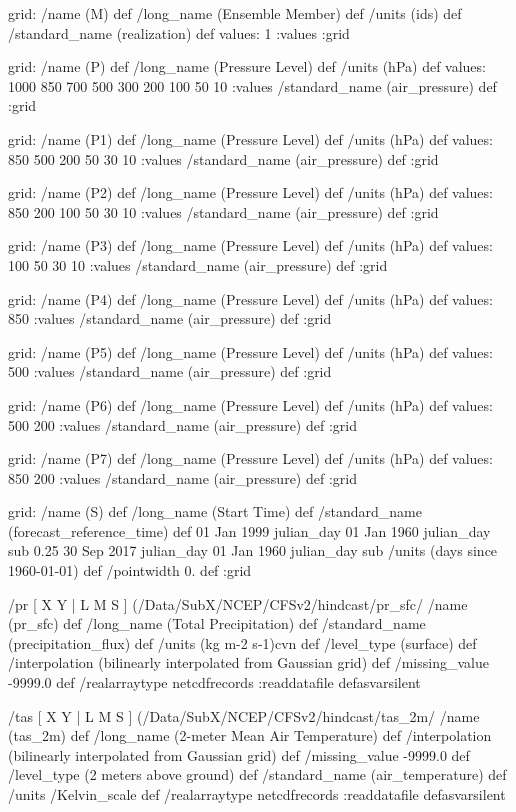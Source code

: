 \begin{ingrid}
grid:
/name (M) def
/long_name (Ensemble Member) def
/units (ids) def
/standard_name (realization) def
values: 1 :values
:grid

grid:
/name (P) def
/long_name (Pressure Level) def
/units (hPa) def
values: 1000 850 700 500 300 200 100 50 10 :values
/standard_name (air_pressure) def
:grid

grid:
/name (P1) def
/long_name (Pressure Level) def
/units (hPa) def
values: 850 500 200 50 30 10 :values
/standard_name (air_pressure) def
:grid

grid:
/name (P2) def
/long_name (Pressure Level) def
/units (hPa) def
values: 850 200 100 50 30 10 :values
/standard_name (air_pressure) def
:grid

grid:
/name (P3) def
/long_name (Pressure Level) def
/units (hPa) def
values: 100 50 30 10 :values
/standard_name (air_pressure) def
:grid

grid:
/name (P4) def
/long_name (Pressure Level) def
/units (hPa) def
values: 850 :values
/standard_name (air_pressure) def
:grid

grid:
/name (P5) def
/long_name (Pressure Level) def
/units (hPa) def
values: 500 :values
/standard_name (air_pressure) def
:grid

grid:
/name (P6) def
/long_name (Pressure Level) def
/units (hPa) def
values: 500 200 :values
/standard_name (air_pressure) def
:grid

grid:
/name (P7) def
/long_name (Pressure Level) def
/units (hPa) def
values: 850 200 :values
/standard_name (air_pressure) def
:grid

grid:
/name (S) def
/long_name (Start Time) def
/standard_name (forecast_reference_time) def
01 Jan 1999 julian_day 01 Jan 1960 julian_day sub 
0.25
30 Sep 2017 julian_day 01 Jan 1960 julian_day sub
/units (days since 1960-01-01) def
/pointwidth 0. def
:grid

 /pr {
[ X Y | L M S ] (/Data/SubX/NCEP/CFSv2/hindcast/pr_sfc/%
/name (pr_sfc) def
 /long_name (Total Precipitation) def
 /standard_name (precipitation_flux) def
 /units (kg m-2 s-1)cvn def
 /level_type (surface) def
 /interpolation (bilinearly interpolated from Gaussian grid) def
 /missing_value -9999.0 def
 /realarraytype netcdfrecords :readdatafile
} defasvarsilent

/tas {
[ X Y | L M S ] (/Data/SubX/NCEP/CFSv2/hindcast/tas_2m/%
/name (tas_2m) def
/long_name (2-meter Mean Air Temperature) def
/interpolation (bilinearly interpolated from Gaussian grid) def
/missing_value -9999.0 def
/level_type (2 meters above ground) def
/standard_name (air_temperature) def
/units /Kelvin_scale def
/realarraytype netcdfrecords :readdatafile
} defasvarsilent


\end{ingrid}
